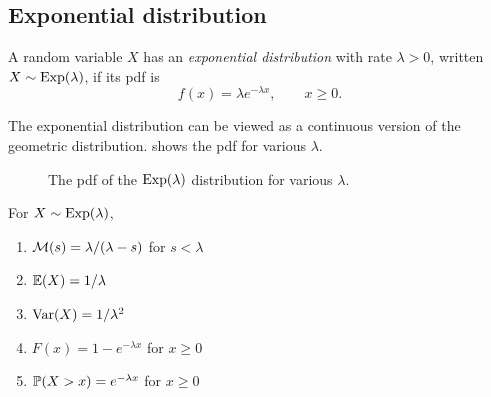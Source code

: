 \subsection{Exponential distribution}\label{sec:exponential}

\begin{definition}\label{def:exponential}
A random variable $X$ has an \emph{exponential distribution} with rate $\lambda > 0$, written $X \sim \mathrm{Exp}(\lambda)$, if its pdf is
\[
  f(x) = \lambda e^{-\lambda x}, \qquad x \ge 0.
\]
\end{definition}

The exponential distribution can be viewed as a continuous version of the geometric distribution.  shows the pdf for various $\lambda$.

\begin{figure}[H]
\centering
{}
\caption{The pdf of the $\mathrm{Exp}(\lambda)$ distribution for various $\lambda$.}
\label{fig:exponential-pdfs}
\end{figure}


\begin{theorem}\label{thm:exponential-properties}
For $X \sim \mathrm{Exp}(\lambda)$,
\begin{enumerate}
  \item $\mathcal{M}(s) = \lambda/(\lambda - s)$ for $s < \lambda$
  \item $\operatorname{\mathbb{E}}(X) = 1/\lambda$
  \item $\operatorname{Var}(X) = 1/\lambda^2$
  \item $F(x) = 1 - e^{-\lambda x}$ for $x \ge 0$
  \item $\mathbb{P}(X > x) = e^{-\lambda x}$ for $x \ge 0$
\end{enumerate}
\end{theorem}

